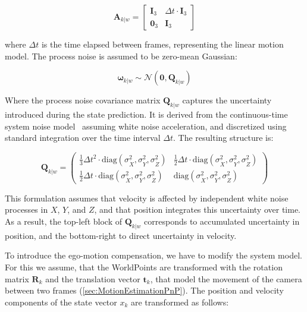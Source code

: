 \begin{equation}
  \mathbf{A}_{k|w} =
  \begin{bmatrix}
    \mathbf{I}_3 & \Delta t \cdot \mathbf{I}_3 \\
    \mathbf{0}_3 & \mathbf{I}_3
  \end{bmatrix}
\end{equation}

where $\Delta t$ is the time elapsed between frames, representing the linear motion model. The process noise is assumed to be zero-mean Gaussian:

\begin{equation}
  \boldsymbol{\omega}_{k|w} \sim \mathcal{N}(\mathbf{0}, \mathbf{Q}_{k|w})
\end{equation}

Where the process noise covariance matrix $\mathbf{Q}_{k|w}$ captures the uncertainty introduced during the 
state prediction. It is derived from the continuous-time system noise model~\cite{6d_vision_detailed} assuming white noise acceleration, 
and discretized using standard integration over the time interval \( \Delta t \). The resulting structure is:

\begin{equation}
  \mathbf{Q}_{k|w} =
  \begin{pmatrix}
    \frac{1}{3} \Delta t^2 \cdot \text{diag}(\sigma^2_{\dot{X}}, \sigma^2_{\dot{Y}}, \sigma^2_{\dot{Z}}) &
    \frac{1}{2} \Delta t \cdot \text{diag}(\sigma^2_{\dot{X}}, \sigma^2_{\dot{Y}}, \sigma^2_{\dot{Z}}) \\
    \frac{1}{2} \Delta t \cdot \text{diag}(\sigma^2_{\dot{X}}, \sigma^2_{\dot{Y}}, \sigma^2_{\dot{Z}}) &
    \text{diag}(\sigma^2_{\dot{X}}, \sigma^2_{\dot{Y}}, \sigma^2_{\dot{Z}})
  \end{pmatrix}
\end{equation}

This formulation assumes that velocity is affected by independent white noise processes in \( X \), \( Y \), and \( Z \), 
and that position integrates this uncertainty over time. As a result, the top-left block of \( \mathbf{Q}_{k|w} \)
corresponds to accumulated uncertainty in position, and the bottom-right to direct uncertainty in velocity.

To introduce the ego-motion compensation, we have to modify the system model. For this we assume, that the WorldPoints are 
transformed with the rotation matrix $\mathbf{R}_k$ and the translation vector $\mathbf{t}_k$, that model the movement of the 
camera between two frames (\ref{sec:MotionEstimationPnP}). The position and velocity components of the state vector $x_k$ are transformed 
as follows:


